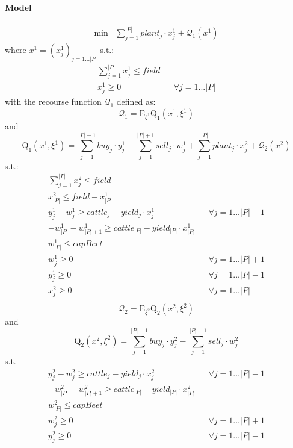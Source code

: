 \documentclass[12pt]{article}
\begin{document}
\paragraph{Model}
\begin{align}
	\text{min} & \sum\limits_{j=1}^{|P|} plant_j \cdot x^1_j + \mathcal{Q}_1(x^1)
\end{align}
where $x^1 = (x_j^1)_{j = 1...|P|}$
s.t.:
\begin{align}
\sum\limits_{j=1}^{|P|} x_j^1 \leq field & & \\
x_j^1 \geq 0 & & \forall j=1...|P|
\end{align}
with the recourse function $\mathcal{Q}_1$ defined as:\\
\begin{equation}
\mathcal{Q}_1 = \mathrm{E}_{\xi^1} \mathrm{Q}_1(x^1,\xi^1)
\end{equation}
and
\begin{equation}
\mathrm{Q}_1(x^1,\xi^1) = \sum\limits_{j=1}^{|P|-1} buy_j \cdot y_j^1 - \sum\limits_{j=1}^{|P|+1} sell_j \cdot w_j^1 + \sum\limits_{j=1}^{|P|} plant_j \cdot x^2_j  + \mathcal{Q}_2(x^2)
\end{equation}
s.t.:
\begin{align}
\sum\limits_{j=1}^{|P|} x_j^2 \leq field & & \\
x_{|P|}^2 \leq field - x_{|P|}^1\\
y_j^1 - w_j^1 \geq cattle_j - yield_j \cdot x_j^1 &  & \forall j=1...|P|-1\\
- w_{|P|}^1- w_{|P|+1}^1 \geq cattle_{|P|} - yield_{|P|} \cdot x_{|P|}^1 & & \\
w_{|P|}^1 \leq capBeet & & \\
w_j^1 \geq 0 & & \forall j=1...|P|+1\\
y_j^1 \geq 0 & & \forall j=1...|P|-1\\
x_j^2 \geq 0 & & \forall j=1...|P|
\end{align}
\begin{align}
\end{align}
\begin{equation}
\mathcal{Q}_2 = \mathrm{E}_{\xi^2} \mathrm{Q}_2(x^2,\xi^2)
\end{equation}
and
\begin{equation}
\mathrm{Q}_2(x^2,\xi^2) = \sum\limits_{j=1}^{|P|-1} buy_j \cdot y_j^2 - \sum\limits_{j=1}^{|P|+1} sell_j \cdot w_j^2
\end{equation}
s.t.
\begin{align}
y_j^2 - w_j^2 \geq cattle_j - yield_j \cdot x_j^2 &  & \forall j=1...|P|-1\\
- w_{|P|}^2- w_{|P|+1}^2 \geq cattle_{|P|} - yield_{|P|} \cdot x_{|P|}^2 & & \\
w_{|P|}^2 \leq capBeet & & \\
w_j^2 \geq 0 & & \forall j=1...|P|+1\\
y_j^2 \geq 0 & & \forall j=1...|P|-1
\end{align}
\end{document}
